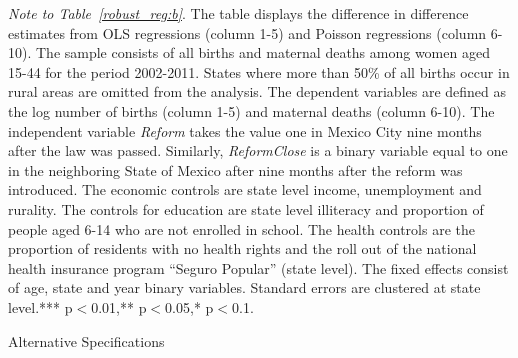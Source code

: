 \documentclass[a4paper, 11pt]{article}
\begin{document}
\begin{spacing}{1.4}
\begin{table}
\begin{threeparttable}
 		
 		\begin{tablenotes} \footnotesize \item \textit{Note to Table~\ref{robust_reg:b}}. The table displays the difference in difference estimates from OLS regressions (column 1-5) and Poisson regressions (column 6-10). The sample consists of all births and maternal deaths among women aged 15-44 for the period 2002-2011. States where more than 50\% of all births occur in rural areas are omitted from the analysis. The dependent variables are defined as the log number of births (column 1-5) and maternal deaths (column 6-10). The independent variable \textit{Reform} takes the value one in Mexico City nine months after the law was passed. Similarly, \textit{ReformClose} is a binary variable equal to one in the neighboring State of Mexico after nine months after the reform was introduced. The economic controls are state level income, unemployment and rurality. The controls for education are state level illiteracy and proportion of people aged 6-14 who are not enrolled in school. The health controls are the proportion of residents with no health rights and the roll out of the national health insurance program ``Seguro Popular'' (state level). The fixed effects consist of age, state and year binary variables. Standard errors are clustered at state level.*** p$<$0.01,** p$<$0.05,* p$<$0.1.	 
 		\end{tablenotes} 
 	\end{threeparttable}
 \end{table}
 

\begin{table}\centering \caption{Alternative Specifications}\label{altspecRates}
  \begin{threeparttable}
   
      {\footnotesize 	}
 

    


\end{threeparttable}
\end{table}
\end{spacing}
\end{document}

